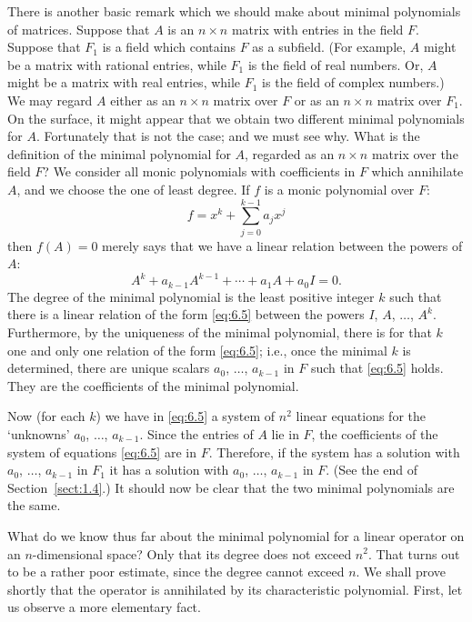 There is another basic remark which we should make about minimal polynomials of matrices. Suppose that \(A\) is an \(n\times n\) matrix with entries in the field \(F\). Suppose that \(F_1\) is a field which contains \(F\) as a subfield. (For example, \(A\) might be a matrix with rational entries, while \(F_1\) is the field of real numbers. Or, \(A\) might be a matrix with real entries, while \(F_1\) is the field of complex numbers.) We may regard \(A\) either as an \(n\times n\) matrix over \(F\) or as an \(n\times n\) matrix over \(F_1\). On the surface, it might appear that we obtain two different minimal polynomials for \(A\). Fortunately that is not the case; and we must see why. What is the definition of the minimal polynomial for \(A\), regarded as an \(n\times n\) matrix over the field \(F\)? We consider all monic polynomials with coefficients in \(F\) which annihilate \(A\), and we choose the one of least degree. If \(f\) is a monic polynomial over \(F\):
\begin{equation}
    f=x^k+\sum_{j=0}^{k-1}a_jx^j
\end{equation}
then \(f\left(A\right)=0\) merely says that we have a linear relation between the powers of \(A\):
\begin{equation}
    A^k+a_{k-1}A^{k-1}+\cdots+a_1A+a_0I=0.\label{eq:6.5}
\end{equation}
The degree of the minimal polynomial is the least positive integer \(k\) such that there is a linear relation of the form \eqref{eq:6.5} between the powers \(I\), \(A\), \(\ldots\), \(A^k\). Furthermore, by the uniqueness of the minimal polynomial, there is for that \(k\) one and only one relation of the form \eqref{eq:6.5}; i.e., once the minimal \(k\) is determined, there are unique scalars \(a_0\), \(\ldots\), \(a_{k-1}\) in \(F\) such that \eqref{eq:6.5} holds. They are the coefficients of the minimal polynomial.

Now (for each \(k\)) we have in \eqref{eq:6.5} a system of \(n^2\) linear equations for the `unknowns' \(a_0\), \(\ldots\), \(a_{k-1}\). Since the entries of \(A\) lie in \(F\), the coefficients of the system of equations \eqref{eq:6.5} are in \(F\). Therefore, if the system has a solution with \(a_0\), \(\ldots\), \(a_{k-1}\) in \(F_1\) it has a solution with \(a_0\), \(\ldots\), \(a_{k-1}\) in \(F\). (See the end of Section~\ref{sect:1.4}.) It should now be clear that the two minimal polynomials are the same.

What do we know thus far about the minimal polynomial for a linear operator on an \(n\)-dimensional space? Only that its degree does not exceed \(n^2\). That turns out to be a rather poor estimate, since the degree cannot exceed \(n\). We shall prove shortly that the operator is annihilated by its characteristic polynomial. First, let us observe a more elementary fact.

